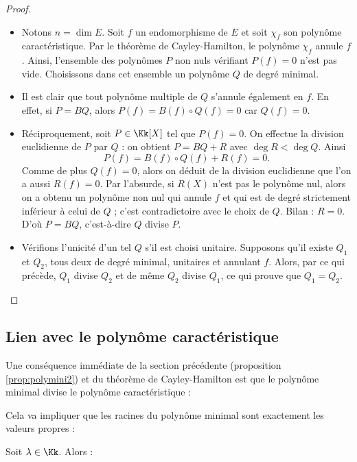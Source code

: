 \documentclass[12pt, class=report,crop=false]{standalone}
\begin{document}
\begin{proof}~
\begin{itemize}
  \item Notons $n=\dim E$. Soit $f$ un endomorphisme de $E$ et soit $\chi_f$ son polynôme caractéristique. Par le théorème de Cayley-Hamilton, le polynôme $\chi_f$  annule $f$.
Ainsi, l'ensemble des polynômes $P$ non nuls vérifiant $P(f)=0$ n'est pas vide. Choisissons dans cet ensemble un polynôme $Q$ de degré minimal. 

  \item Il est clair que tout polynôme multiple de $Q$ s'annule également en $f$. En effet, si $P=BQ$, alors $P(f)=B(f)\circ Q(f)=0$ car $Q(f) = 0$.
 
 
  \item Réciproquement, soit $P\in \Kk[X]$ tel que $P(f)=0$. On effectue la division euclidienne de $P$ par $Q$ : on obtient $P=BQ+R$ avec $\deg R<\deg Q$. Ainsi 
$$P(f)=B(f)\circ Q(f)+R(f)=0.$$
Comme de plus $Q(f)=0$, alors on déduit de la division euclidienne que l'on a aussi $R(f)=0$. Par l'absurde, si $R(X)$ n'est pas le polynôme nul, alors on a obtenu un polynôme non nul qui annule $f$ et qui est de degré strictement inférieur à celui de $Q$ ; c'est contradictoire avec le choix de $Q$. Bilan : $R=0$. D'où $P=BQ$, c'est-à-dire $Q$ divise $P$.

   \item Vérifions l'unicité d'un tel $Q$ s'il est choisi unitaire.
   Supposons qu'il existe $Q_1$ et $Q_2$, tous deux de degré minimal, unitaires et annulant $f$. Alors, par ce qui précède, $Q_1$ divise $Q_2$ et de même $Q_2$ divise $Q_1$, ce qui prouve que $Q_1=Q_2$.
\end{itemize}
\end{proof}





\subsection{Lien avec le polynôme caractéristique}

Une conséquence immédiate de la section précédente (proposition \ref{prop:polymini2}) et du théorème de Cayley-Hamilton est que le polynôme minimal divise le polynôme caractéristique :


Cela va impliquer que les racines du polynôme minimal sont exactement les valeurs propres :
\begin{proposition}
Soit $\lambda \in \Kk$. Alors :
\end{proposition} 
\end{document}
